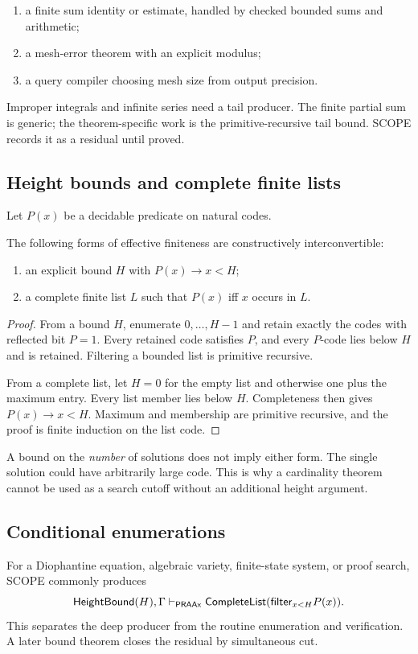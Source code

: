 \begin{enumerate}
\item a finite sum identity or estimate, handled by checked bounded sums and arithmetic;
\item a mesh-error theorem with an explicit modulus;
\item a query compiler choosing mesh size from output precision.
\end{enumerate}

Improper integrals and infinite series need a tail producer.  The finite partial sum is generic; the theorem-specific work is the primitive-recursive tail bound.  SCOPE records it as a residual until proved.

\subsection{Height bounds and complete finite lists}

Let \(P(x)\) be a decidable predicate on natural codes.

\begin{theorem}
\label{thm:height-list}
The following forms of effective finiteness are constructively interconvertible:

\begin{enumerate}
\item an explicit bound \(H\) with \(P(x)\to x<H\);
\item a complete finite list \(L\) such that \(P(x)\) iff \(x\) occurs in \(L\).
\end{enumerate}
\end{theorem}
\begin{proof}
From a bound \(H\), enumerate \(0,\ldots,H-1\) and retain exactly the codes with reflected bit \(P=1\).  Every retained code satisfies \(P\), and every \(P\)-code lies below \(H\) and is retained.  Filtering a bounded list is primitive recursive.

From a complete list, let \(H=0\) for the empty list and otherwise one plus the maximum entry.  Every list member lies below \(H\).  Completeness then gives \(P(x)\to x<H\).  Maximum and membership are primitive recursive, and the proof is finite induction on the list code.
\end{proof}

A bound on the \emph{number} of solutions does not imply either form.  The single solution could have arbitrarily large code.  This is why a cardinality theorem cannot be used as a search cutoff without an additional height argument.

\subsection{Conditional enumerations}

For a Diophantine equation, algebraic variety, finite-state system, or proof search, SCOPE commonly produces
\[
  \mathsf{HeightBound}(H),\Gamma\vdash_{\mathsf{PRAAx}}
  \mathsf{CompleteList}(\mathsf{filter}_{x<H}P(x)).
\]
This separates the deep producer from the routine enumeration and verification.  A later bound theorem closes the residual by simultaneous cut.
